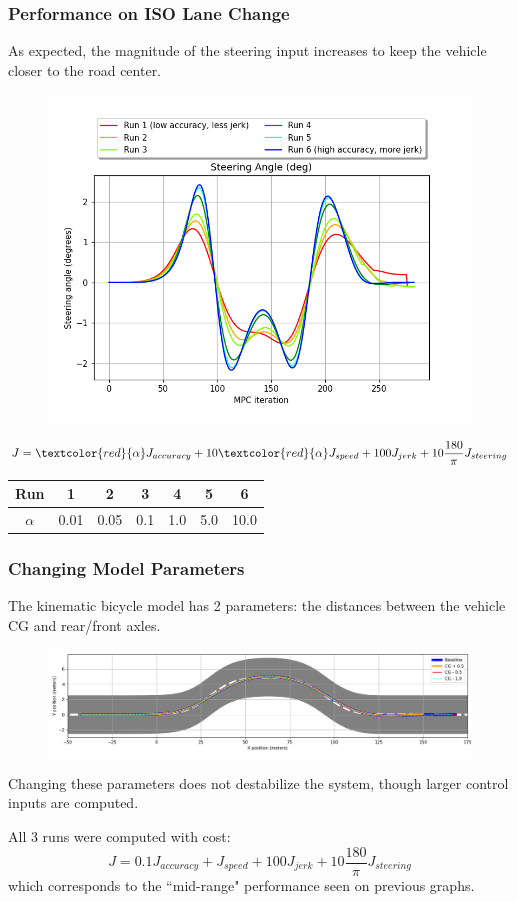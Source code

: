 \documentclass{beamer}
\begin{document}
\begin{frame}
\frametitle{Performance on ISO Lane Change}

As expected, the magnitude of the steering input increases to keep the vehicle closer to the road center.
\vspace{-0.5em}
\begin{figure}
	\includegraphics[width=0.6\linewidth]{figures/steering_angle.png}
\end{figure}
\vspace{-1.0em}

\small
$$J = \textcolor{red}{\alpha} J_{accuracy} + 10\textcolor{red}{\alpha} J_{speed} + 100 J_{jerk} + 10\frac{180}{\pi} J_{steering}$$

\begin{table}
\begin{tabular}{c|cccccc}
Run & 1 & 2 & 3 & 4 & 5 & 6
\\\hline
$\alpha$ & 0.01 & 0.05 & 0.1 & 1.0 & 5.0 & 10.0
\end{tabular}
\end{table}
\normalsize
\end{frame}


\begin{frame}
\frametitle{Changing Model Parameters}

The kinematic bicycle model has 2 parameters: the distances between the vehicle CG and rear/front axles.

\vspace{-0.5em}
\begin{figure}
	\centering
	\includegraphics[width=1.0\linewidth]{figures/road_paths_cg.png}
\end{figure}


Changing these parameters does not destabilize the system, though
larger control inputs are computed.

All 3 runs were computed with cost:
$$J = 0.1J_{accuracy} + J_{speed} + 100J_{jerk} + 10\frac{180}{\pi} J_{steering}$$
which corresponds to the ``mid-range" performance seen on previous graphs.
\end{frame}
\end{document}

